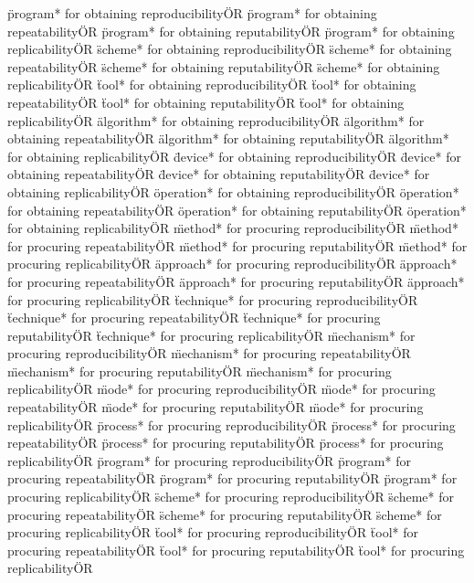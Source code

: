 \documentclass[
10pt, %
a4paper, %
oneside, %
headinclude,footinclude, %
BCOR5mm, %
]{scrartcl}
\begin{document}
\"program* for obtaining reproducibility\" OR \"program* for obtaining repeatability\" OR \"program* for obtaining reputability\" OR \"program* for obtaining replicability\" OR 
\"scheme* for obtaining reproducibility\" OR \"scheme* for obtaining repeatability\" OR \"scheme* for obtaining reputability\" OR \"scheme* for obtaining replicability\" OR 
\"tool* for obtaining reproducibility\" OR \"tool* for obtaining repeatability\" OR \"tool* for obtaining reputability\" OR \"tool* for obtaining replicability\" OR 
\"algorithm* for obtaining reproducibility\" OR \"algorithm* for obtaining repeatability\" OR \"algorithm* for obtaining reputability\" OR \"algorithm* for obtaining replicability\" OR 
\"device* for obtaining reproducibility\" OR \"device* for obtaining repeatability\" OR \"device* for obtaining reputability\" OR \"device* for obtaining replicability\" OR 
\"operation* for obtaining reproducibility\" OR \"operation* for obtaining repeatability\" OR \"operation* for obtaining reputability\" OR \"operation* for obtaining replicability\" OR 
\"method* for procuring reproducibility\" OR \"method* for procuring repeatability\" OR \"method* for procuring reputability\" OR \"method* for procuring replicability\" OR 
\"approach* for procuring reproducibility\" OR \"approach* for procuring repeatability\" OR \"approach* for procuring reputability\" OR \"approach* for procuring replicability\" OR 
\"technique* for procuring reproducibility\" OR \"technique* for procuring repeatability\" OR \"technique* for procuring reputability\" OR \"technique* for procuring replicability\" OR 
\"mechanism* for procuring reproducibility\" OR \"mechanism* for procuring repeatability\" OR \"mechanism* for procuring reputability\" OR \"mechanism* for procuring replicability\" OR 
\"mode* for procuring reproducibility\" OR \"mode* for procuring repeatability\" OR \"mode* for procuring reputability\" OR \"mode* for procuring replicability\" OR 
\"process* for procuring reproducibility\" OR \"process* for procuring repeatability\" OR \"process* for procuring reputability\" OR \"process* for procuring replicability\" OR 
\"program* for procuring reproducibility\" OR \"program* for procuring repeatability\" OR \"program* for procuring reputability\" OR \"program* for procuring replicability\" OR 
\"scheme* for procuring reproducibility\" OR \"scheme* for procuring repeatability\" OR \"scheme* for procuring reputability\" OR \"scheme* for procuring replicability\" OR 
\"tool* for procuring reproducibility\" OR \"tool* for procuring repeatability\" OR \"tool* for procuring reputability\" OR \"tool* for procuring replicability\" OR 
\end{document}
